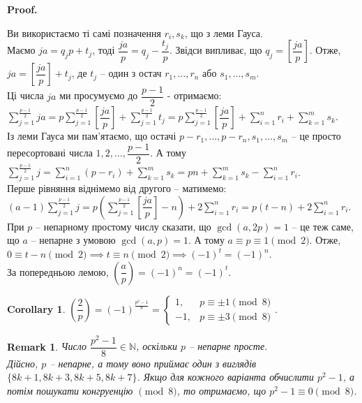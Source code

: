 \documentclass[a4paper, 10pt]{article}
\makeatletter
\theoremstyle{theoremdd}
\theoremstyle{theoremdd}
\theoremstyle{theoremdd}
\theoremstyle{theoremdd}
\theoremstyle{theoremdd}
\theoremstyle{theoremdd}
\newtheorem{remark}[theorem]{Remark}
\theoremstyle{theoremdd}
\theoremstyle{theoremdd}
\newtheorem{corollary}[theorem]{Corollary}
\renewenvironment{proof}[1][Proof.\\]{\par
\pushQED{\hfill \qed}%
\normalfont \topsep6\p@\@plus6\p@\relax
\trivlist
\item\relax
{\bfseries
#1\@addpunct{.}}\hspace\labelsep\ignorespaces
}{%
\popQED\endtrivlist\@endpefalse
}
\makeatother
\begin{document}
\begin{proof}
Ви використаємо ті самі позначення $r_i,s_k$, що з леми Гауса.\\
Маємо $ja = q_j p + t_j$, тоді $\dfrac{ja}{p} = q_j - \dfrac{t_j}{p}$. Звідси випливає, що $q_j = \left[ \dfrac{ja}{p} \right]$. Отже, $ja = \left[ \dfrac{ja}{p} \right] + t_j$, де $t_j$ -- один з остач $r_1,\dots,r_n$ або $s_1,\dots,s_m$.\\
Ці числа $ja$ ми просумуємо до $\dfrac{p-1}{2}$ - отримаємо:\\
$\displaystyle\sum_{j=1}^{\frac{p-1}{2}} ja = p\sum_{j=1}^{\frac{p-1}{2}} \left[ \dfrac{ja}{p} \right] + \sum_{j=1}^{\frac{p-1}{2}}t_j = p\sum_{j=1}^{\frac{p-1}{2}} \left[ \dfrac{ja}{p} \right] + \sum_{i=1}^n r_i + \sum_{k=1}^m s_k$.\\
Із леми Гауса ми пам'ятаємо, що остачі $p-r_1,\dots,p-r_n, s_1,\dots,s_m$ -- це просто пересортовані числа $1,2,\dots,\dfrac{p-1}{2}$. А тому\\
$\displaystyle\sum_{j=1}^{\frac{p-1}{2}} j = \sum_{i=1}^n (p-r_i) + \sum_{k=1}^m s_k = pn + \sum_{k=1}^m s_k - \sum_{i=1}^n r_i$.\\
Перше рівняння віднімемо від другого -- матимемо:\\
$\displaystyle (a-1)\sum_{j=1}^{\frac{p-1}{2}}j = p \left( \sum_{j=1}^{\frac{p-1}{2}} \left[ \dfrac{ja}{p} \right] - n \right) + 2 \sum_{i=1}^n r_i = p(t-n)+2 \sum_{i=1}^n r_i$.\\
При $p$ -- непарному простому числу сказати, що $\gcd(a,2p) = 1$ -- це теж саме, що $a$ -- непарне з умовою $\gcd(a,p) = 1$. А тому $a \equiv p \equiv 1 \pmod 2$. Отже,\\
$0 \equiv t-n \pmod 2 \implies t \equiv n \pmod 2 \implies (-1)^t = (-1)^n$.\\
За попередньою лемою, $\left( \dfrac{a}{p} \right) = (-1)^n = (-1)^t$.
\end{proof}

\begin{corollary}
$\left( \dfrac{2}{p} \right) = (-1)^{\textstyle\frac{p^2-1}{8}} = \begin{cases} 1, & p \equiv \pm 1 \pmod 8 \\ -1, & p \equiv \pm 3 \pmod 8 \end{cases}$.
\end{corollary}

\begin{remark}
Число $\dfrac{p^2-1}{8} \in \mathbb{N}$, оскільки $p$ -- непарне просте.\\ Дійсно, $p$ -- непарне, а тому воно приймає один з виглядів $\{8k+1,8k+3,8k+5,8k+7\}$. Якщо для кожного варіанта обчислити $p^2-1$, а потім пошукати конгруенцію $\!\! \pmod 8$, то отримаємо, що $p^2-1 \equiv 0 \pmod 8$.
\end{remark}
\end{document}
